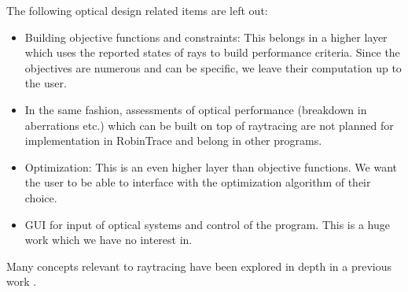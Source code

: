 The following optical design related items are left out:
\begin{itemize}
\item Building objective functions and constraints: This belongs in a higher
layer which uses the reported states of rays to build performance criteria.
Since the objectives are numerous and can be specific, we leave their
computation up to the user.
\item In the same fashion, assessments of optical performance
(breakdown in aberrations etc.) which can be built on top of raytracing
are not planned for implementation in RobinTrace and belong in other
programs.
\item Optimization: This is an even higher layer than objective functions.
We want the user to be able to interface with the optimization algorithm
of their choice.
\item GUI for input of optical systems and control of the program. This
is a huge work which we have no interest in.
\end{itemize}

Many concepts relevant to raytracing have been explored in depth in a previous
work \cite{Houllier-thesis}.

